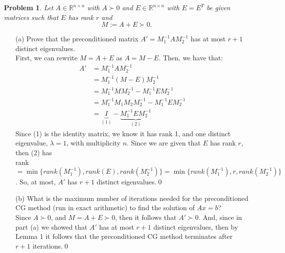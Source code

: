 \documentclass[12pt]{article}
\newtheorem{problem}{Problem}
\def\R{\mathbb{R}}
\begin{document}
\noindent
\begin{problem} Let $A\in\R^{n\times n}$ with $A \succ 0$ and $E\in\R^{n\times n}$ with $E=E^T$ be given matrices such that $E$ has rank $r$ and 
$$M := A + E \succ 0.$$
\end{problem}
\begin{itemize}
\item[(a)] Prove that the preconditioned matrix $A' = M_1^{-1}AM_2^{-1}$ has at most $r+1$ distinct eigenvalues.\\

First, we can rewrite $M = A + E$ as $A = M - E$.  Then, we have that:
\begin{align}
A' &= M_1^{-1}AM_2^{-1} \nonumber \\
&= M_1^{-1}(M-E)M_2^{-1} \nonumber \\
&= M_1^{-1}MM_2^{-1} - M_1^{-1}EM_2^{-1} \nonumber \\
&= M_1^{-1}M_1M_2M_2^{-1} - M_1^{-1}EM_2^{-1} \nonumber \\
&= \underbrace{I}_{(1)} - \underbrace{M_1^{-1}EM_2^{-1}}_{(2)} \nonumber 
\end{align}
Since (1) is the identity matrix, we know it has rank 1, and one distinct eigenvalue, $\lambda = 1$, with multiplicity $n$.  Since we are given that $E$ has rank $r$, then (2) has\\
rank $=\min\{rank(M_1^{-1}),rank(E), rank(M_2^{-1})\} = \min\{rank(M_1^{-1}),r, rank(M_2^{-1})\}$.  So, at most, $A'$ has $r+1$ distinct eigenvalues.\qed\\


\item[(b)] What is the maximum number of iterations needed for the preconditioned CG method (run in exact arithmetic) to find the solution of $Ax=b$?\\

Since $A \succ 0$, and $M = A + E \succ 0$, then it follows that $A' \succ 0$.  And, since in part (a) we showed that $A'$ has at most $r+1$ distinct eigenvalues, then by Lemma 1 it follows that the preconditioned CG method terminates after $r+1$ iterations.\qed\\
\end{itemize}
\end{document}
